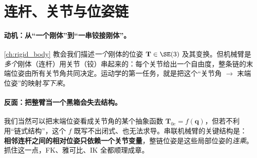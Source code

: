 \section{连杆、关节与位姿链}
\label{sec:ak-chain}

\paragraph{动机：从“一个刚体”到“一串铰接刚体”。}
\cref{ch:rigid_body} 教会我们描述\emph{一个}刚体的位姿 $\mathbf{T}\in\SE(3)$ 及其变换。但机械臂是\emph{多个}刚体（连杆）用关节（铰）串起来的：每个关节给出一个自由度，整条链的末端位姿由所有关节角共同决定。运动学的第一任务，就是把这个“关节角 $\to$ 末端位姿”的映射\emph{写下来}。

\paragraph{反面：把整臂当一个黑箱会失去结构。}
我们当然可以把末端位姿看成关节角的某个抽象函数 $\mathbf{T}_{0e}=f(\mathbf{q})$，但若不利用“链式结构”，这个 $f$ 既写不出闭式、也无法求导。串联机械臂的关键结构是：\textbf{相邻连杆之间的相对位姿只依赖一个关节变量}，整链位姿是这些局部位姿的\emph{连乘}。抓住这一点，FK、雅可比、IK 全都顺理成章。

